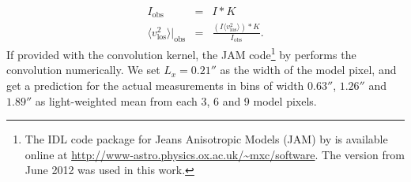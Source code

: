 \begin{eqnarray*}
I_\text{obs} &=& I \ast K\\
\langle v_\text{los}^2 \rangle |_\text{obs} &=& \frac{(I \langle v_\text{los}^2\rangle) \ast K}{I_\text{obs}}.
\end{eqnarray*}
If provided with the convolution kernel, the JAM code\footnote{The IDL code package for Jeans Anisotropic Models (JAM) by \citet{Cap08} is available online at \url{http://www-astro.physics.ox.ac.uk/~mxc/software}. The version from June 2012 was used in this work.} by \citet{Cap08} performs the convolution numerically. We set $L_x = 0.21''$ as the width of the model pixel, and get a prediction for the actual measurements in bins of width $0.63''$, $1.26''$ and $1.89''$ \citep{SWELLSV} as light-weighted mean from each 3, 6 and 9 model pixels.

